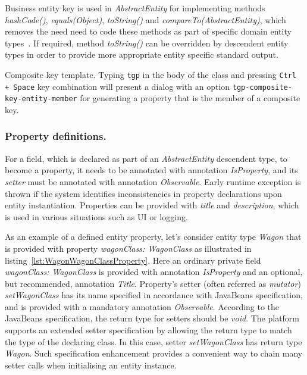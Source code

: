   Business entity key is used in \emph{AbstractEntity} for implementing methods \emph{hashCode()}, \emph{equals(Object)}, \emph{toString()} and \emph{compareTo(AbstractEntity)}, which removes the need  need to code these methods as part of specific domain entity types~\cite{Bloch2008}.
  If required, method \emph{toString()} can be overridden by descendent entity types in order to provide more appropriate entity specific standard output.

  \begin{notebox}{Composite key template.}{\label{nb:EclipseTemplatesForCompositeKey}}
    Typing \texttt{tgp} in the body of the class and pressing \texttt{Ctrl + Space} key combination will present a dialog with an option \texttt{tgp-composite-key-entity-member} for generating a property that is the member of a composite key.
  \end{notebox}

  \subsubsection*{Property definitions.}
  
  For a field, which is declared as part of an \emph{AbstractEntity} descendent type, to become a property, it needs to be annotated with annotation \emph{IsProperty}, and its \emph{setter} must be annotated with annotation \emph{Observable}.
  Early runtime exception is thrown if the system identifies inconsistencies in property declarations upon entity instantiation.
  Properties can be provided with \emph{title} and \emph{description}, which is used in various situations such as UI or logging.
  
  As an example of a defined entity property, let's consider entity type \emph{Wagon} that is provided with property \emph{wagonClass: WagonClass} as illustrated in listing~\ref{lst:WagonWagonClassProperty}.
  Here an ordinary private field \emph{wagonClass: WagonClass} is provided with annotation \emph{IsProperty} and an optional, but recommended, annotation \emph{Title}.
  Property's setter (often referred as \emph{mutator}) \emph{setWagonClass} has its name specified in accordance with JavaBeans specification, and is provided with a mandatory annotation \emph{Observable}.
  According to the JavaBeans specification, the return type for setters should be \emph{void}.
  The platform supports an extended setter specification by allowing the return type to match the type of the declaring class.
  In this case, setter \emph{setWagonClass} has return type \emph{Wagon}.
  Such specification enhancement provides a convenient way to chain many setter calls when initialising an entity instance.
  
